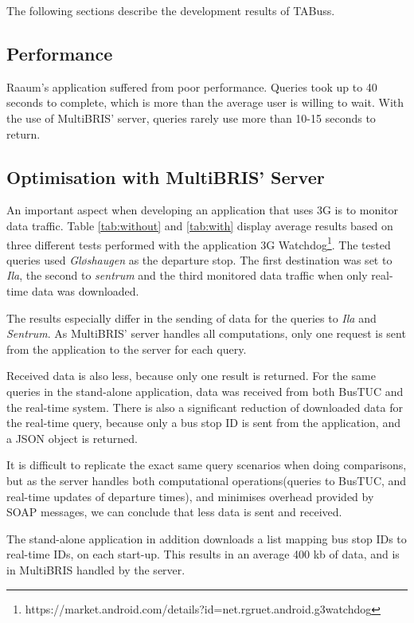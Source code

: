 The following sections describe the development results of TABuss. 
\subsection{Performance}
Raaum's application suffered from poor performance. Queries took up to 40 seconds to complete, which is more than the average user is willing to wait. With the use of MultiBRIS' \cite{multibris} server, queries rarely use more than 10-15 seconds to return. 


\subsection{Optimisation with MultiBRIS' Server}

An important aspect when developing an application that uses 3G is to monitor data traffic. Table \ref{tab:without} and \ref{tab:with} display average results based on three different tests performed with the application 3G Watchdog\footnote{https://market.android.com/details?id=net.rgruet.android.g3watchdog}. The tested queries used \emph{Gl\o shaugen} as the departure stop. The first destination was set to \emph{Ila}, the second to \emph{sentrum} and the third monitored data traffic when only real-time data was downloaded.

The results especially differ in the sending of data for the queries to \emph{Ila} and \emph{Sentrum}. As MultiBRIS' server handles all computations, only one request is sent from the application to the server for each query.

Received data is also less, because only one result is returned. For the same queries in the stand-alone application, data was received from both BusTUC and the real-time system. There is also a significant reduction of downloaded data for the real-time query, because only a bus stop ID is sent from the application, and a JSON object is returned. 

It is difficult to replicate the exact same query scenarios when doing comparisons, but as the server handles both computational operations(queries to BusTUC, and real-time updates of departure times), and minimises overhead provided by SOAP messages, we can conclude that less data is sent and received. 

The stand-alone application in addition downloads a list mapping bus stop IDs to real-time IDs, on each start-up. This results in an average 400 kb of data, and is in MultiBRIS handled by the server.

